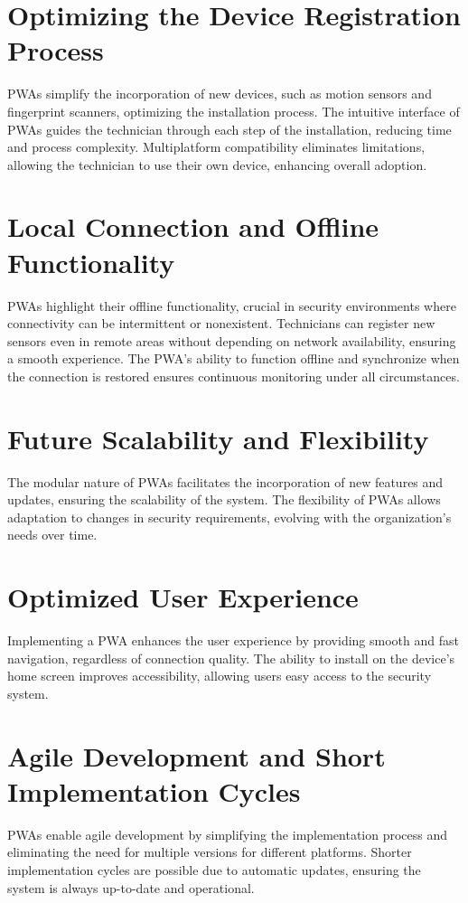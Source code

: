 \documentclass[journal]{IEEEtran}
\begin{document}
	\section*{Optimizing the Device Registration Process}
	PWAs simplify the incorporation of new devices, such as motion sensors and fingerprint scanners, optimizing the installation process. The intuitive interface of PWAs guides the technician through each step of the installation, reducing time and process complexity. Multiplatform compatibility eliminates limitations, allowing the technician to use their own device, enhancing overall adoption.
	
	\section*{Local Connection and Offline Functionality}
	PWAs highlight their offline functionality, crucial in security environments where connectivity can be intermittent or nonexistent. Technicians can register new sensors even in remote areas without depending on network availability, ensuring a smooth experience. The PWA's ability to function offline and synchronize when the connection is restored ensures continuous monitoring under all circumstances.
	
	\section*{Future Scalability and Flexibility}
	The modular nature of PWAs facilitates the incorporation of new features and updates, ensuring the scalability of the system. The flexibility of PWAs allows adaptation to changes in security requirements, evolving with the organization's needs over time.
	
	\section*{Optimized User Experience}
	Implementing a PWA enhances the user experience by providing smooth and fast navigation, regardless of connection quality. The ability to install on the device's home screen improves accessibility, allowing users easy access to the security system.
	
	\section*{Agile Development and Short Implementation Cycles}
	PWAs enable agile development by simplifying the implementation process and eliminating the need for multiple versions for different platforms. Shorter implementation cycles are possible due to automatic updates, ensuring the system is always up-to-date and operational.
	
\end{document}
